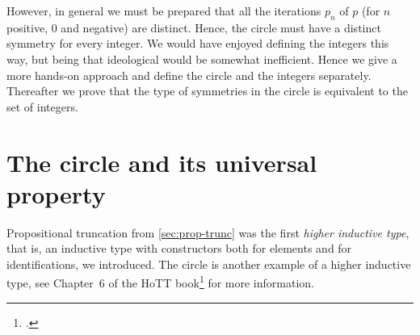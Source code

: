 However, in general we must be prepared that all the iterations $p_n$
of $p$ (for $n$ positive, $0$ and negative) are distinct.
Hence, the circle must have a distinct symmetry for every integer.
We would have enjoyed defining the integers this way,
but being that ideological would be somewhat inefficient.
Hence we give a more hands-on approach and define the circle
and the integers separately. Thereafter we prove that the type of
symmetries in the circle is equivalent to the set of integers.

\section{The circle and its universal property}
\label{sec:S1}

Propositional truncation from \cref{sec:prop-trunc} was
the first \emph{higher inductive type}, that is, an inductive type
with constructors both for elements and for identifications,
we introduced.
The circle is another example of a higher inductive type,
see Chapter~6 of the HoTT book\footcite{hottbook} for more information.

